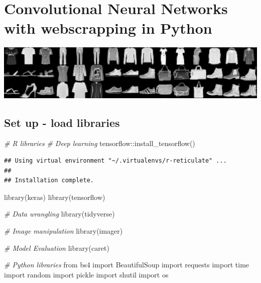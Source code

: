 \documentclass[
]{article}
\author{}
\date{\vspace{-2.5em}}
\newenvironment{Shaded}{\begin{snugshade}}{\end{snugshade}}
\newcommand{\CommentTok}[1]{\textcolor[rgb]{0.56,0.35,0.01}{\textit{#1}}}
\newcommand{\FunctionTok}[1]{\textcolor[rgb]{0.00,0.00,0.00}{#1}}
\newcommand{\ImportTok}[1]{#1}
\newcommand{\NormalTok}[1]{#1}
\newcommand{\SpecialCharTok}[1]{\textcolor[rgb]{0.00,0.00,0.00}{#1}}
\begin{document}
\hypertarget{convolutional-neural-networks-with-webscrapping-in-python}{%
\section{Convolutional Neural Networks with webscrapping in
Python}\label{convolutional-neural-networks-with-webscrapping-in-python}}

\includegraphics{02_fashionmnist.png}

\hypertarget{set-up---load-libraries}{%
\subsection{Set up - load libraries}\label{set-up---load-libraries}}

\begin{Shaded}
\begin{Highlighting}[]
\CommentTok{\# R libraries}
\CommentTok{\# Deep learning}
\NormalTok{tensorflow}\SpecialCharTok{::}\FunctionTok{install\_tensorflow}\NormalTok{()}
\end{Highlighting}
\end{Shaded}

\begin{verbatim}
## Using virtual environment "~/.virtualenvs/r-reticulate" ...
## 
## Installation complete.
\end{verbatim}

\begin{Shaded}
\begin{Highlighting}[]
\FunctionTok{library}\NormalTok{(keras)}
\FunctionTok{library}\NormalTok{(tensorflow)}

\CommentTok{\# Data wrangling}
\FunctionTok{library}\NormalTok{(tidyverse)}

\CommentTok{\# Image manipulation}
\FunctionTok{library}\NormalTok{(imager)}

\CommentTok{\# Model Evaluation}
\FunctionTok{library}\NormalTok{(caret)}
\end{Highlighting}
\end{Shaded}

\begin{Shaded}
\begin{Highlighting}[]
\CommentTok{\# Python libraries}
\ImportTok{from}\NormalTok{ bs4 }\ImportTok{import}\NormalTok{ BeautifulSoup}
\ImportTok{import}\NormalTok{ requests}
\ImportTok{import}\NormalTok{ time}
\ImportTok{import}\NormalTok{ random}
\ImportTok{import}\NormalTok{ pickle}
\ImportTok{import}\NormalTok{ shutil}
\ImportTok{import}\NormalTok{ os}
\end{Highlighting}
\end{Shaded}
\end{document}
